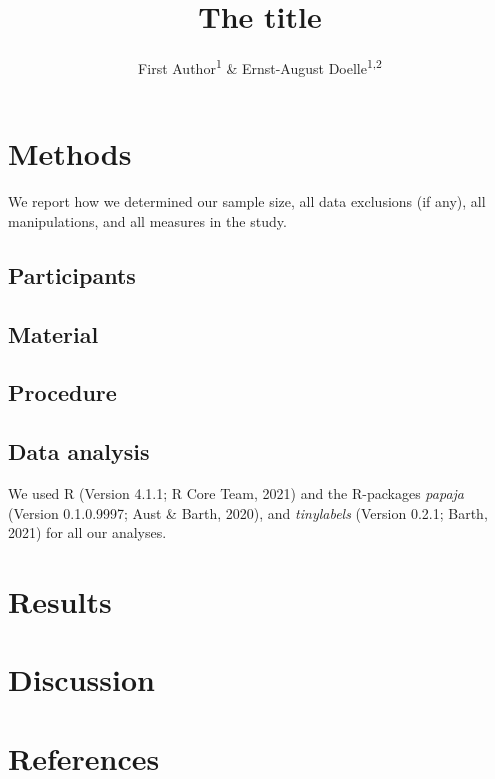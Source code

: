 \documentclass[
  english,
  man]{apa6}
\title{The title}
\author{First Author\textsuperscript{1} \& Ernst-August Doelle\textsuperscript{1,2}}
\date{}
\affiliation{\vspace{0.5cm}\textsuperscript{1} Wilhelm-Wundt-University\\\textsuperscript{2} Konstanz Business School}
\begin{document}
\maketitle

\hypertarget{methods}{%
\section{Methods}\label{methods}}

We report how we determined our sample size, all data exclusions (if any), all manipulations, and all measures in the study.

\hypertarget{participants}{%
\subsection{Participants}\label{participants}}

\hypertarget{material}{%
\subsection{Material}\label{material}}

\hypertarget{procedure}{%
\subsection{Procedure}\label{procedure}}

\hypertarget{data-analysis}{%
\subsection{Data analysis}\label{data-analysis}}

We used R (Version 4.1.1; R Core Team, 2021) and the R-packages \emph{papaja} (Version 0.1.0.9997; Aust \& Barth, 2020), and \emph{tinylabels} (Version 0.2.1; Barth, 2021) for all our analyses.

\hypertarget{results}{%
\section{Results}\label{results}}

\hypertarget{discussion}{%
\section{Discussion}\label{discussion}}

\newpage

\hypertarget{references}{%
\section{References}\label{references}}
\end{document}
